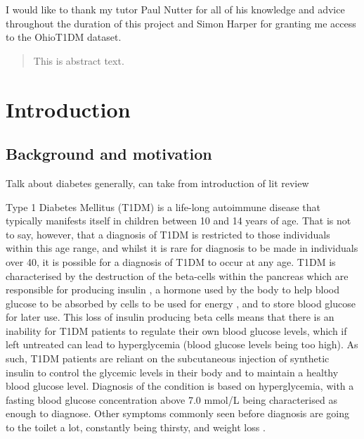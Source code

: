 \uomtoc%

\begin{uomacknowledgements}
  I would like to thank my tutor Paul Nutter for all of his knowledge and advice throughout the duration of this project and Simon Harper for granting me access to the OhioT1DM dataset.
\end{uomacknowledgements}
  
\begin{abstract} %
  This is abstract text. 
  
\end{abstract}%
\clearpage

\section{Introduction}

  \subsection{Background and motivation}
    Talk about diabetes generally, can take from introduction of lit review

    Type 1 Diabetes Mellitus (T1DM) is a life-long autoimmune disease that typically manifests itself in children between 10 and 14 years of age. That is not to say, however, that a diagnosis of T1DM is restricted to those individuals within this age range, and whilst it is rare for diagnosis to be made in individuals over 40, it is possible for a diagnosis of T1DM to occur at any age. T1DM is characterised by the destruction of the beta-cells within the pancreas which are responsible for producing insulin \cite{t1d}, a hormone used  by the body to help blood glucose to be absorbed by cells to be used for energy \cite{insulin}, and to store blood glucose for later use. This loss of insulin producing beta cells means that there is an inability for T1DM patients to regulate their own blood glucose levels, which if left untreated can lead to hyperglycemia (blood glucose levels being too high). As such, T1DM patients are reliant on the subcutaneous injection of synthetic insulin to control the glycemic levels in their body and to maintain a healthy blood glucose level. Diagnosis of the condition is based on hyperglycemia, with a fasting blood glucose concentration above 7.0 mmol/L being characterised as enough to diagnose. Other symptoms commonly seen before diagnosis are going to the toilet a lot, constantly being thirsty, and weight loss \cite{t1dcauses}.

